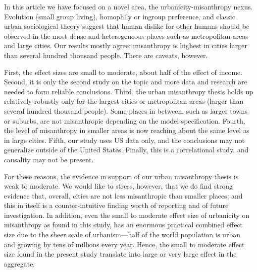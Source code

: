 \documentclass[11pt, letterpaper]{article}
\begin{document}
\begin{spacing}{1.4}
In this article we have focused on a  novel area, the urbanicity-misanthropy
nexus. %
Evolution  (small group living),  homophily or ingroup preference, and classic urban sociological theory suggest that human dislike for other humans should be observed in the most dense and heterogeneous places such as metropolitan areas and large cities. Our results mostly agree: misanthropy is highest in cities larger than several hundred thousand people. There are caveats, however. 

First, the effect sizes are small to moderate, about half of the
effect of income. Second, it is only the second study  \citep[after][]{wilson85} on the topic and more data and research are needed to form  reliable conclusions. Third, the urban
misanthropy thesis holds up relatively robustly only for the largest cities or metropolitan areas (larger than several hundred thousand people). Some places in between, such as larger towns or suburbs, are not misanthropic depending on the model specification. Fourth,
the level of misanthropy in smaller areas is now reaching about the same level
as in large cities. Fifth, our study uses US data only, and the conclusions may not
generalize outside of the United States. Finally, this is a correlational study, and causality
may not be present. 
% 

For these reasons, the evidence in support of our urban misanthropy thesis is
 weak to moderate.  We would like to stress, however, that we do find strong evidence that,
 overall,  cities are not less misanthropic than smaller places, and this in
 itself is a counter-intuitive finding worth of reporting and of future investigation.
 In addition, even the small to moderate effect size of urbanicity on misanthropy
 as found in this study, has an enormous practical combined effect size due to the
 sheer scale of urbanism---half of the world population is urban and growing by tens
 of millions every year. Hence, the small to moderate effect size found in the
 present study translate into large or very large effect in the aggregate. 


\end{spacing}
\end{document}
